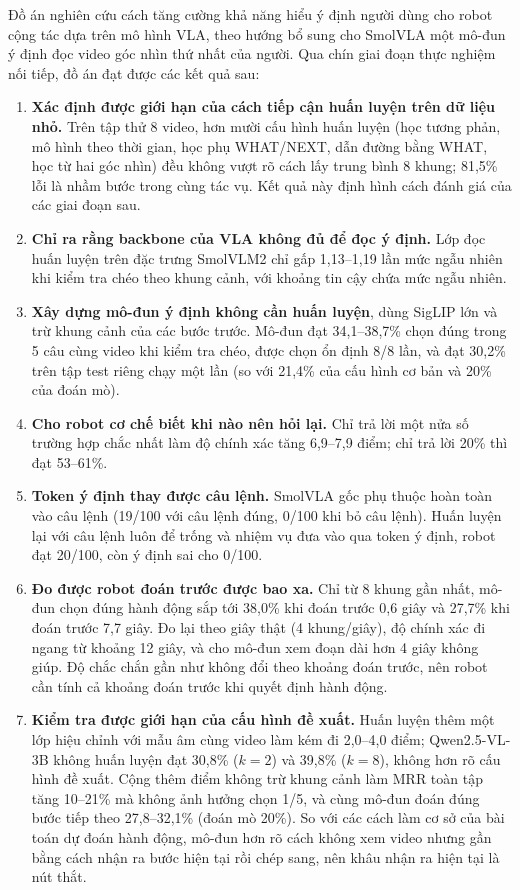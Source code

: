 \documentclass[a4paper,oneside]{report}
\begin{document}
Đồ án nghiên cứu cách tăng cường khả năng hiểu ý định người dùng cho robot cộng tác dựa trên mô hình VLA, theo hướng bổ sung cho SmolVLA một mô-đun ý định đọc video góc nhìn thứ nhất của người. Qua chín giai đoạn thực nghiệm nối tiếp, đồ án đạt được các kết quả sau:
\begin{enumerate}
  \item \textbf{Xác định được giới hạn của cách tiếp cận huấn luyện trên dữ liệu nhỏ.} Trên tập thử 8 video, hơn mười cấu hình huấn luyện (học tương phản, mô hình theo thời gian, học phụ WHAT/NEXT, dẫn đường bằng WHAT, học từ hai góc nhìn) đều không vượt rõ cách lấy trung bình 8 khung; 81,5\% lỗi là nhầm bước trong cùng tác vụ. Kết quả này định hình cách đánh giá của các giai đoạn sau.
  \item \textbf{Chỉ ra rằng backbone của VLA không đủ để đọc ý định.} Lớp đọc huấn luyện trên đặc trưng SmolVLM2 chỉ gấp 1,13--1,19 lần mức ngẫu nhiên khi kiểm tra chéo theo khung cảnh, với khoảng tin cậy chứa mức ngẫu nhiên.
  \item \textbf{Xây dựng mô-đun ý định không cần huấn luyện}, dùng SigLIP lớn và trừ khung cảnh của các bước trước. Mô-đun đạt 34,1--38,7\% chọn đúng trong 5 câu cùng video khi kiểm tra chéo, được chọn ổn định 8/8 lần, và đạt 30,2\% trên tập test riêng chạy một lần (so với 21,4\% của cấu hình cơ bản và 20\% của đoán mò).
  \item \textbf{Cho robot cơ chế biết khi nào nên hỏi lại.} Chỉ trả lời một nửa số trường hợp chắc nhất làm độ chính xác tăng 6,9--7,9 điểm; chỉ trả lời 20\% thì đạt 53--61\%.
  \item \textbf{Token ý định thay được câu lệnh.} SmolVLA gốc phụ thuộc hoàn toàn vào câu lệnh (19/100 với câu lệnh đúng, 0/100 khi bỏ câu lệnh). Huấn luyện lại với câu lệnh luôn để trống và nhiệm vụ đưa vào qua token ý định, robot đạt 20/100, còn ý định sai cho 0/100.
  \item \textbf{Đo được robot đoán trước được bao xa.} Chỉ từ 8 khung gần nhất, mô-đun chọn đúng hành động sắp tới 38,0\% khi đoán trước 0,6 giây và 27,7\% khi đoán trước 7,7 giây. Đo lại theo giây thật (4 khung/giây), độ chính xác đi ngang từ khoảng 12 giây, và cho mô-đun xem đoạn dài hơn 4 giây không giúp. Độ chắc chắn gần như không đổi theo khoảng đoán trước, nên robot cần tính cả khoảng đoán trước khi quyết định hành động.
  \item \textbf{Kiểm tra được giới hạn của cấu hình đề xuất.} Huấn luyện thêm một lớp hiệu chỉnh với mẫu âm cùng video làm kém đi 2,0--4,0 điểm; Qwen2.5-VL-3B không huấn luyện đạt 30,8\% ($k=2$) và 39,8\% ($k=8$), không hơn rõ cấu hình đề xuất. Cộng thêm điểm không trừ khung cảnh làm MRR toàn tập tăng 10--21\% mà không ảnh hưởng chọn 1/5, và cùng mô-đun đoán đúng bước tiếp theo 27,8--32,1\% (đoán mò 20\%). So với các cách làm cơ sở của bài toán dự đoán hành động, mô-đun hơn rõ cách không xem video nhưng gần bằng cách nhận ra bước hiện tại rồi chép sang, nên khâu nhận ra hiện tại là nút thắt.
\end{enumerate}
\end{document}
